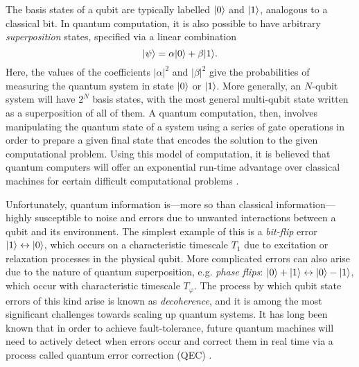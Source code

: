 The basis states of a qubit are typically labelled $\lvert0\rangle$ and $\lvert1\rangle$, analogous to a classical bit. In quantum computation, it is also possible to have arbitrary \textit{superposition} states, specified via a linear combination
\begin{equation}
    \lvert\psi\rangle = \alpha\lvert0\rangle + \beta\lvert1\rangle.
\end{equation}
Here, the values of the coefficients $|\alpha|^2$ and $|\beta|^2$ give the probabilities of measuring the quantum system in state $\lvert0\rangle$ or $\lvert1\rangle$. More generally, an $N$-qubit system will have $2^N$ basis states, with the most general multi-qubit state written as a superposition of all of them. A quantum computation, then, involves manipulating the quantum state of a system using a series of gate operations in order to prepare a given final state that encodes the solution to the given computational problem. Using this model of computation, it is believed that quantum computers will offer an exponential run-time advantage over classical machines for certain difficult computational problems \cite{manenti2023quantum, ike-and-mike}. 

Unfortunately, quantum information is---more so than classical information---highly susceptible to noise and errors due to unwanted interactions between a qubit and its environment. The simplest example of this is a \textit{bit-flip} error $\lvert1\rangle \leftrightarrow \lvert0\rangle$, which occurs on a characteristic timescale $T_1$ due to excitation or relaxation processes in the physical qubit. More complicated errors can also arise due to the nature of quantum superposition, e.g. \textit{phase flips}: $\lvert0\rangle + \lvert1\rangle \leftrightarrow \lvert0\rangle - \lvert1\rangle$, which occur with characteristic timescale $T_\varphi$. The process by which qubit state errors of this kind arise is known as \textit{decoherence}, and it is among the most significant challenges towards scaling up quantum systems. It has long been known that in order to achieve fault-tolerance, future quantum machines will need to actively detect when errors occur and correct them in real time via a process called quantum error correction (QEC) \cite{shor1996fault}.

